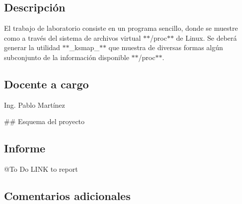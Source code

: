 \subsection*{Descripción}

El trabajo de laboratorio consiste en un programa sencillo, donde se muestre como a través del sistema de archivos virtual $\ast$$\ast$/proc$\ast$$\ast$ de Linux. Se deberá generar la utilidad $\ast$$\ast$\+\_\+ksmap\+\_\+$\ast$$\ast$ que muestra de diversas formas algún subconjunto de la información disponible $\ast$$\ast$/proc$\ast$$\ast$.

\subsection*{Docente a cargo}

Ing. Pablo Martínez

\#\# Esquema del proyecto 
\begin{DoxyCode}{0}
\end{DoxyCode}
 \subsection*{Informe}

@\+To Do L\+I\+NK to report

\subsection*{Comentarios adicionales}